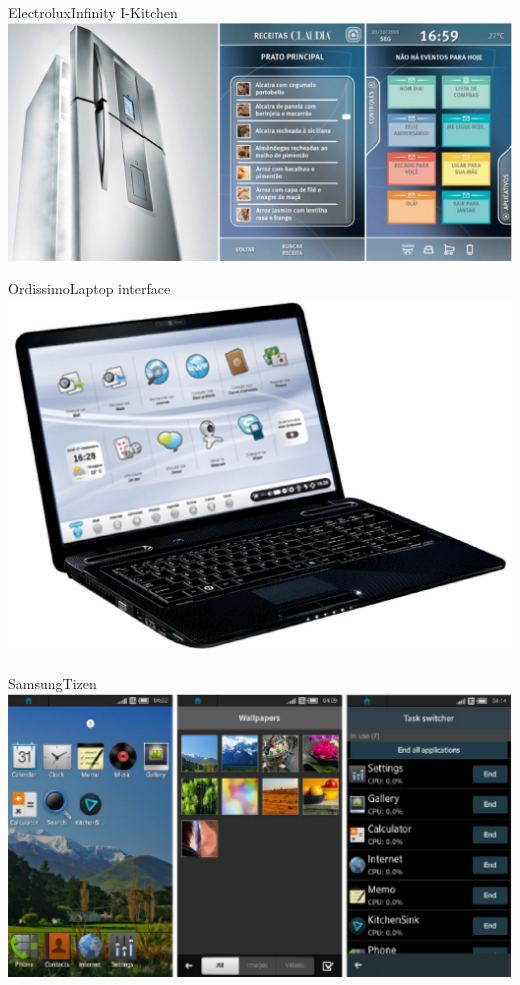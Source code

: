\documentclass{beamer}
\begin{document}
    \begin{frame}{Electrolux}{Infinity I-Kitchen}
        \includegraphics[width=\linewidth]{img/frigorifico-infinity-i-kitchen.eps}
    \end{frame}

    \begin{frame}{Ordissimo}{Laptop interface}
        \includegraphics[width=\linewidth]{img/ordissimo.eps}
    \end{frame}

    \begin{frame}{Samsung}{Tizen}
        \includegraphics[width=\linewidth]{img/Tizen-UI1.eps}
    \end{frame}
\end{document}
